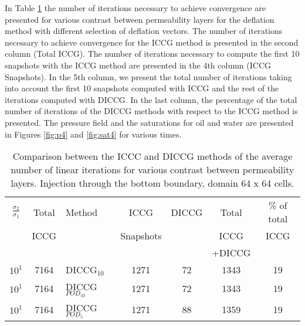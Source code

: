 \documentclass[12pt]{article}
\begin{document}
In Table \ref{table:liter4} the number of iterations necessary to achieve convergence are presented for various contrast between permeability layers for the deflation method with different selection of deflation vectors. The number of iterations necessary to achieve convergence for the ICCG method is presented in the second column (Total ICCG). The number of iterations necessary to compute the first 10 snapshots with the ICCG method are presented in the 4th column (ICCG Snapshots). In the 5th column, we present the total number of iterations taking into account the first 10 snapshots computed with ICCG and the rest of the iterations computed with DICCG. In the last column, the percentage of the total number of iterations of the DICCG methods with respect to the ICCG method is presented.   
The pressure field and the saturations for oil and water are presented in Figures \ref{fig:p4} and \ref{fig:sat4} for various times.
\begin{table}[!h]\centering
\begin{minipage}{1\textwidth}
 \centering
\begin{tabular}{ ||c|c||l|c|c|c|c||} 
\hline
$\frac{\sigma_2}{\sigma_1}$&Total&Method  & ICCG&DICCG &Total&\% of total\\ 
                           & ICCG     &  & Snapshots& &ICCG& ICCG\\ 
                            &     &  & & &+DICCG& \\
 \hline 
$10^{1}$ &7164& DICCG$_{10}$&1271&72&1343&19\\ 
\hline  
$10^{1}$ &7164& DICCG$_{POD_{10}}$&1271&72&1343&19 \\ 
\hline  
$10^{1}$ &7164& DICCG$_{POD_{5}}$&1271&88&1359&19 \\ 
\hline 


\end{tabular} 
\caption{Comparison between the ICCC and DICCG methods of the average number of linear iterations for various contrast between permeability layers. Injection through the bottom boundary, domain 64 x 64 cells.}\label{table:liter4} 
\end{minipage}  
\end{table}  
\end{document}
